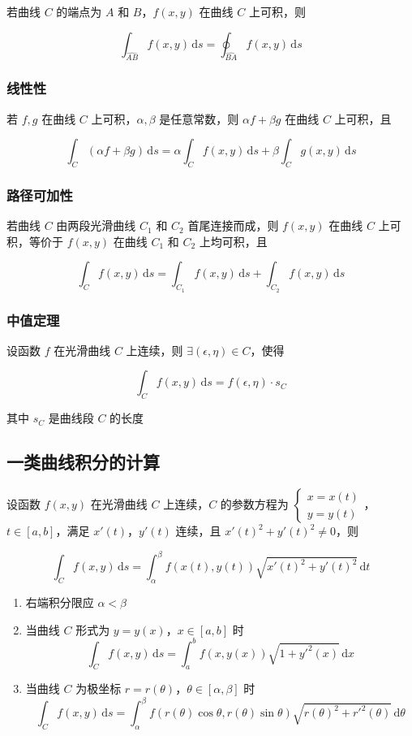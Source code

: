 \documentclass[lang = zh , final , oneside , openany , titlepage , zihao = -4 , linespread = 1.3 , baselineskip = false , cjk-font = windows , text-font = newtx , math-font = newtx , math-style = TeX]{sjtureport}
\begin{document}
若曲线 \(C\) 的端点为 \(A\) 和 \(B\)，\(f(x,y)\) 在曲线 \(C\) 上可积，则

\[\int_{\widehat{AB}} f(x,y)\,\mathrm{d}s=\oint_{\widehat{BA}} f(x,y)\,\mathrm{d}s\]

\subsubsection{线性性}

若 \(f,g\) 在曲线 \(C\) 上可积，\(\alpha , \beta\) 是任意常数，则
\(\alpha f + \beta g\) 在曲线 \(C\) 上可积，且

\[\int_C (\alpha f + \beta g)\,\mathrm{d}s = \alpha \int_C f(x,y)\,\mathrm{d}s + \beta \int_C g(x,y)\,\mathrm{d}s\]

\subsubsection{路径可加性}

若曲线 \(C\) 由两段光滑曲线 \(C_1\) 和 \(C_2\) 首尾连接而成，则
\(f(x,y)\) 在曲线 \(C\) 上可积，等价于 \(f(x,y)\) 在曲线 \(C_1\) 和
\(C_2\) 上均可积，且

\[\int_C f(x,y)\,\mathrm{d}s = \int_{C_1} f(x,y)\,\mathrm{d}s + \int_{C_2} f(x,y)\,\mathrm{d}s\]

\subsubsection{中值定理}

设函数 \(f\) 在光滑曲线 \(C\) 上连续，则
\(\exists (\epsilon,\eta)\in C\)，使得

\[\int_C f(x,y)\,\mathrm{d}s = f(\epsilon,\eta)\cdot s_C\]

其中 \(s_C\) 是曲线段 \(C\) 的长度

\subsection{一类曲线积分的计算}

设函数 \(f(x,y)\) 在光滑曲线 \(C\) 上连续，\(C\) 的参数方程为
\(\begin{cases}x=x(t)\\y=y(t)\end{cases}\)，\(t\in [a,b]\)，满足
\(x'(t)\)，\(y'(t)\) 连续，且 \(x'(t)^2 + y'(t)^2 \neq 0\)，则

\[\int_C f(x,y)\,\mathrm{d}s = \int_\alpha^\beta f(x(t),y(t))\sqrt{x'(t)^2 + y'(t)^2}\,\mathrm{d}t\]

\begin{enumerate}
\item
  右端积分限应 \(\alpha < \beta\)
\item
  当曲线 \(C\) 形式为 \(y=y(x)\)，\(x\in [a,b]\) 时
  \[\displaystyle\int_Cf(x,y)\,\mathrm{d}s =\int_a^bf(x,y(x))\sqrt{1+y'^2(x)}\,\mathrm{d}x\]
\item
  当曲线 \(C\) 为极坐标 \(r=r(\theta)\)，\(\theta\in [\alpha,\beta]\)
  时
  \[\displaystyle\int_Cf(x,y)\,\mathrm{d}s = \int_\alpha^\beta f(r(\theta)\cos\theta,r(\theta)\sin\theta)\sqrt{r(\theta)^2+r'^2(\theta)}\,\mathrm{d}\theta\]
\end{enumerate}
\end{document}
